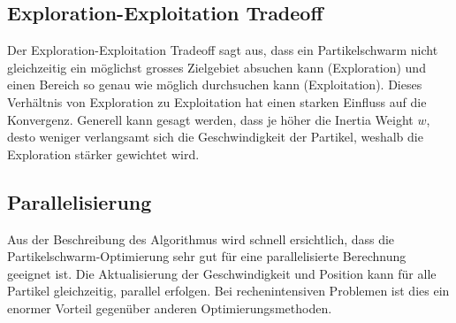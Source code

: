 \subsection{Exploration-Exploitation Tradeoff}
Der Exploration-Exploitation Tradeoff sagt aus, dass ein Partikelschwarm nicht gleichzeitig ein möglichst grosses Zielgebiet absuchen kann (Exploration) und einen Bereich so genau wie möglich durchsuchen kann (Exploitation). Dieses Verhältnis von Exploration zu Exploitation hat einen starken Einfluss auf die Konvergenz. Generell kann gesagt werden, dass je höher die Inertia Weight $w$, desto weniger verlangsamt sich die Geschwindigkeit der Partikel, weshalb die Exploration stärker gewichtet wird.

\subsection{Parallelisierung}
Aus der Beschreibung des Algorithmus wird schnell ersichtlich, dass die Partikelschwarm-Optimierung sehr gut für eine parallelisierte Berechnung geeignet ist. Die Aktualisierung der Geschwindigkeit und Position kann für alle Partikel gleichzeitig, parallel erfolgen. Bei rechenintensiven Problemen ist dies ein enormer Vorteil gegenüber anderen Optimierungsmethoden.